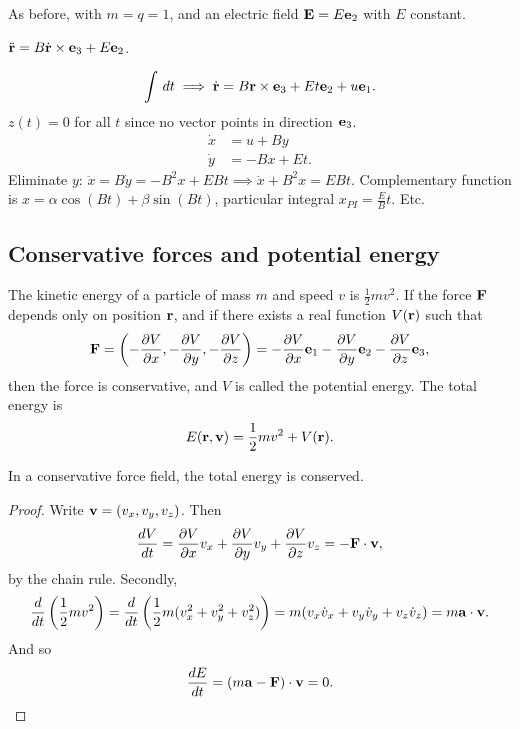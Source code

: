 \documentclass[10pt, a4paper]{article}
\begin{document}
\begin{example}
    As before,
    with $m = q = 1$,
    and an electric field $\mbf{E} = E\mbf{e}_2$ with $E$ constant.

    \begin{solution}
        $\ddot{\mbf{r}} = B\dot{\mbf{r}} \times \mbf{e}_3 + E\mbf{e}_2$.

        \[
        \int\,dt \implies \dot{\mbf{r}} = B\mbf{r} \times \mbf{e}_3 + Et\mbf{e}_2 + u\mbf{e}_1.
        \]
        $z(t) = 0$ for all $t$ since no vector points in direction $\mbf{e}_3$.
        \begin{align*}
            \dot{x} &= u + By \\
            \dot{y} &= -Bx + Et.
        \end{align*}
        Eliminate $y$:
        $\ddot{x} = B\dot{y} = -B ^ 2x + EBt \implies \ddot{x} + B ^ 2x = EBt$.
        Complementary function is $x = \alpha\cos(Bt) + \beta\sin(Bt)$,
        particular integral $x_{PI} = \frac{E}{B}t$.
        Etc.
        
    \end{solution}
\end{example}

\subsection{Conservative forces and potential energy}
The kinetic energy of a particle of mass $m$ and speed $v$ is $\frac{1}{2}mv ^ 2$.
If the force $\mbf{F}$ depends only on position $\mbf{r}$,
and if there exists a real function $V(\mbf{r})$ such that
\[
\mbf{F} = \left(-\pd[V]{x}, -\pd[V]{y}, -\pd[V]{z}\right) = -\pd[V]{x}\mbf{e}_1 -\pd[V]{y}\mbf{e}_2 - \pd[V]{z}\mbf{e}_3,
\]
then the force is conservative,
and $V$ is called the potential energy.
The total energy is
\[
E(\mbf{r}, \mbf{v}) = \frac{1}{2}mv ^ 2 + V(\mbf{r}).
\]

\begin{proposition}
    In a conservative force field,
    the total energy is conserved.

    \begin{proof}
        Write $\mbf{v} = (v_x, v_y, v_z)$.
        Then
        \[
        \frac{dV}{dt} = \pd[V]{x}v_x + \pd[V]{y}v_y + \pd[V]{z}v_z = -\mbf{F} \cdot \mbf{v},
        \]
        by the chain rule.
        Secondly,
        \[
        \frac{d}{dt}\left(\frac{1}{2}mv ^ 2\right) = \frac{d}{dt}\left(\frac{1}{2}m(v_x ^ 2 + v_y ^ 2 + v_z ^ 2)\right) = m(v_x\dot{v}_x + v_y\dot{v}_y + v_z\dot{v}_z) = m\mbf{a} \cdot \mbf{v}.
        \]
        And so
        \[
        \frac{dE}{dt} = (m\mbf{a} - \mbf{F}) \cdot \mbf{v} = 0.
        \]
    \end{proof}
\end{proposition}
\end{document}
